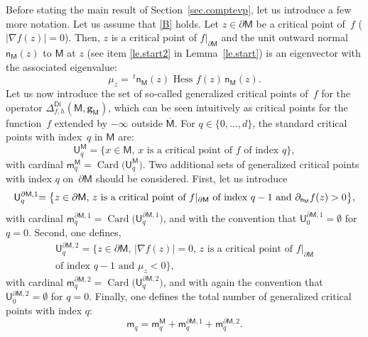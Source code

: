 \documentclass[JEP,XML,SOM,Unicode,NoEqCountersInSection,NoFloatCountersInSection,published]{cedram}
\DeclareMathOperator{\Card}{Card}
\newcommand{\mbf}[1]{\mathbf{#1}}
\let\pa\partial
\theoremstyle{plain}
\theoremstyle{definition}
\begin{document}
Before stating the main result of Section~\ref{sec.comptevp}, let us
introduce a few more notation. Let us assume that \hbox{\ref{B}} holds. Let $z\in \pa \mathsf M$ be a critical point of~$f$ (\ie $\vert \nabla f(z)\vert =0$). Then, $z$ is a critical point of $f|_{\pa \mathsf M}$ and
the unit outward normal~$\mathsf n_{\mathsf M}(z)$ to $ \mathsf M$
at $z$ (see item \eqref{le.start2} in Lemma~\ref{le.start}) is an eigenvector with
the associated eigenvalue:
\begin{equation}\label{eq.lambdad}
\mu_z = \,^t \mathsf n_{\mathsf M}(z) \text{ Hess } f(z) \, \mathsf n_{\mathsf M}(z).
\end{equation}
Let us now introduce the set of so-called generalized critical
points of~$f$ for the operator $\Delta_{f,h}^{\mathsf{Di}}(\mathsf
M,\mbf g_{\mathsf M})$, which can be seen intuitively as critical
points for the function~$f$ extended by $-\infty$ outside
$\overline{\mathsf M}$.
For $q\in \{0,\ldots,d\}$, the standard critical points with index~$q$
in $\mathsf M$ are:
\[
\mathsf U_q^{\mathsf M}= \big \{x \in \mathsf M, \, x \text{ is a
critical point of } f \text{ of index } q \big \},
\]
with cardinal $\mathsf m_{q}^{\mathsf M}=\Card\bigl(\mathsf
U_q^{\mathsf M}\bigr)$. Two additional sets of generalized critical
points with index $q$ on~$\partial \mathsf M$ should be considered. First, let us introduce
\begin{equation}\label{eq.PSGENE}
\mathsf U_q^{\pa \mathsf M,1}\hspace*{-1mm}= \big \{z \in \pa \mathsf M, \, z \text{ is a critical point of } f|_{\pa \mathsf M} \text{ of index } q-1 \text{ and } \partial_{\mathsf n_{ \mathsf M}}f(z)>0\big \},
\end{equation}
with cardinal $
\mathsf m_q^{\pa \mathsf M,1}=\Card\bigl (\mathsf U_q^{\pa
\mathsf M,1} \bigr)$, and
with the convention that $
\mathsf U_0^{\pa \mathsf M,1}=\emptyset$
for $q=0$. Second, one defines,
\begin{multline}\label{eq.PS-nouveau}
\mathsf U_q^{\pa \mathsf M,2}=\big \{z \in \pa \mathsf M, \, \vert
\nabla f(z)\vert =0, \, z \text{ is a critical point of } f|_{\pa
\mathsf M}\\
\text{of index } q-1\text{ and }\mu_z <0\big \},
\end{multline}
with cardinal $\mathsf m_q^{\pa \mathsf M,2}=\Card\bigl(\mathsf U_q^{\pa \mathsf M,2}\bigr)$, and with again the convention
that $
\mathsf U_0^{\pa \mathsf M,2}=\emptyset$ for $q=0$.
Finally, one defines the total number
of generalized critical points with index $q$:
\begin{equation}\label{numb-generalize}
\mathsf m_q=\mathsf m_q^{ \mathsf M}+\mathsf m_q^{\pa \mathsf M,1}+\mathsf m_q^{\pa \mathsf M,2}.
\end{equation}
\end{document}
